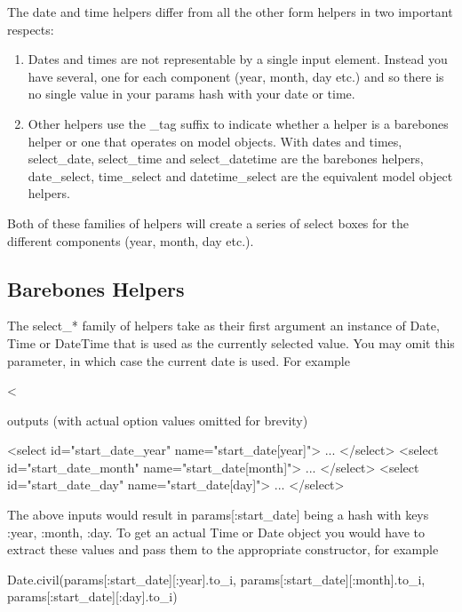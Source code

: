 \documentclass[10pt]{book}
\newenvironment{code}{%
  \scriptsize
    \verbatim
}{%
    \endverbatim
    \newline
}
\begin{document}
The date and time helpers differ from all the other form helpers in two important respects:
\begin{enumerate}
	\item Dates and times are not representable by a single input element.  Instead you have several, one for each component (year, month, day etc.)  and so there is no single value in your params hash with your date or time.
	\item Other helpers use the \_tag suffix to indicate whether a helper is a barebones helper or one that operates on model objects. With dates and times, select\_date, select\_time and select\_datetime are the barebones helpers, date\_select, time\_select and datetime\_select are the equivalent model object helpers.
\end{enumerate}

Both of these families of helpers will create a series of select boxes for the different components (year, month, day etc.).

\subsection{ Barebones Helpers}

The select\_* family of helpers take as their first argument  an instance of Date, Time or DateTime that is used as the currently  selected value. You may omit this parameter, in which case the current  date is used. For example
\begin{code}
<%
\end{code}

outputs (with actual option values omitted for brevity)
\begin{code}
<select id="start_date_year" name="start_date[year]"> ... </select>
<select id="start_date_month" name="start_date[month]"> ... </select>
<select id="start_date_day" name="start_date[day]"> ... </select>
\end{code}

The above inputs would result in params[:start\_date] being a hash with keys :year, :month, :day.  To get an actual Time or Date object you would have to extract these  values and pass them to the appropriate constructor, for example
\begin{code}
Date.civil(params[:start_date][:year].to_i,
           params[:start_date][:month].to_i, 
           params[:start_date][:day].to_i)
\end{code}
\end{document}
